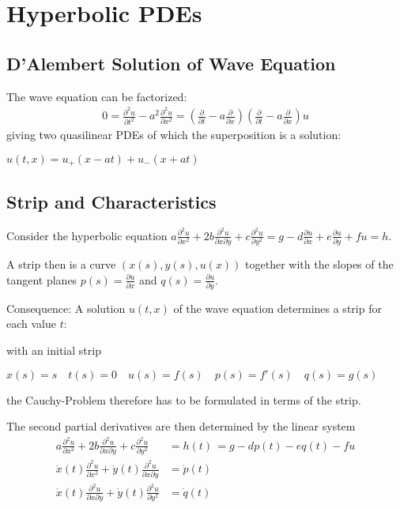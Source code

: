 \section{Hyperbolic PDEs}
\subsection{D'Alembert Solution of Wave Equation}
The wave equation can be factorized:
\begin{align*}
    0 = \frac{\partial^2 u}{\partial t^2} - a^2 \frac{\partial^2 u}{\partial x^2}
    = \left(
    \frac{\partial}{\partial t}-a\frac{\partial}{\partial x}
    \right)
    \left(
    \frac{\partial}{\partial t}-a\frac{\partial}{\partial x}
    \right)
    u
\end{align*}
giving two quasilinear PDEs of which the superposition is a solution:

$u(t,x) = u_+(x-at)+u_-(x+at)$

\subsection{Strip and Characteristics}

Consider the hyperbolic equation
\colorbox{shadecolor}{$
    \displaystyle
    a\frac{\partial^{2}u}{\partial x^{2}}+2b\frac{\partial^{2}u}{\partial x\partial y}+c\frac{\partial^{2}u}{\partial y^{2}}=g-d\frac{\partial u}{\partial x}+e\frac{\partial u}{\partial y}+f u=h.
$}

A strip then is a curve $(x(s), y(s), u(x))$ together with the slopes of the tangent planes
$p(s) = \frac{\partial u}{\partial x}$ and $q(s) = \frac{\partial u}{\partial y}$.

Consequence: A solution $u(t,x)$ of the wave equation determines a strip for each value $t$:

with an initial strip

$x(s) = s\quad t(s) = 0\quad u(s) = f(s)\quad p(s) = f'(s)\quad q(s)=g(s)$

the Cauchy-Problem therefore has to be formulated in terms of the strip.

The second partial derivatives are then determined by the linear system
\begin{align*}
    a\frac{\partial^{2}u}{\partial x^{2}}+2b\frac{\partial^{2}u}{\partial x\partial y}
    + c\frac{\partial^{2}u}{\partial y^{2}} & = h(t)\,=g-d p(t)-e q(t)-f u \\
    \dot{x}(t)\frac{\partial^{2}u}{\partial x^{2}}+\dot{y}(t)\frac{\partial^{2}u}{\partial x\partial y} & = \dot{p}(t) \\
    \dot{x}(t)\frac{\partial^{2}u}{\partial x\partial y} + \dot{y}(t)\frac{\partial^{2}u}{\partial y^2} & = \dot{q}(t)
\end{align*}

